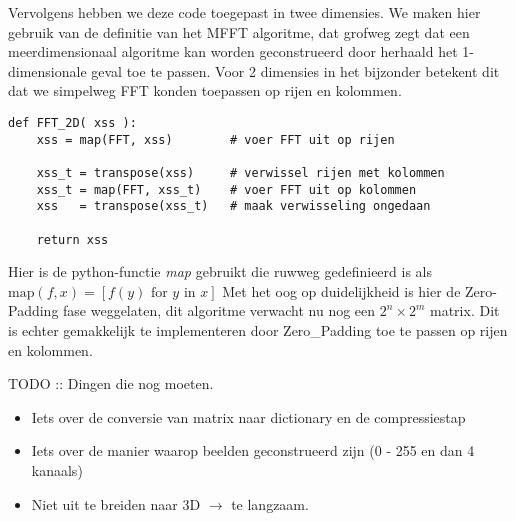 Vervolgens hebben we deze code toegepast in twee dimensies. We maken hier gebruik van de definitie van het
MFFT algoritme, dat grofweg zegt dat een meerdimensionaal algoritme kan worden geconstrueerd door herhaald 
het 1-dimensionale geval toe te passen. Voor 2 dimensies in het bijzonder betekent dit dat we simpelweg 
FFT konden toepassen op rijen en kolommen.

\begin{lstlisting}[caption=2-Dimensionaal FFT algoritme]
def FFT_2D( xss ):
    xss = map(FFT, xss)        # voer FFT uit op rijen

    xss_t = transpose(xss)     # verwissel rijen met kolommen
    xss_t = map(FFT, xss_t)    # voer FFT uit op kolommen
    xss   = transpose(xss_t)   # maak verwisseling ongedaan 

    return xss
\end{lstlisting}
Hier is de python-functie \emph{map} gebruikt die ruwweg gedefinieerd is als 
$\text{map}(f,x) = [f(y) \text{ for } y \text{ in } x]$
Met het oog op duidelijkheid is hier de Zero-Padding fase weggelaten, 
dit algoritme verwacht nu nog een $2^n \times 2^m$ matrix.
Dit is echter gemakkelijk te implementeren door Zero\_Padding toe te passen op rijen en kolommen.


TODO :: 
Dingen die nog moeten.
\begin{itemize}
\item Iets over de conversie van matrix naar dictionary en de compressiestap 
\item Iets over de manier waarop beelden geconstrueerd zijn (0 - 255 en dan 4 kanaals)
\item Niet uit te breiden naar 3D $\to$ te langzaam.
\end{itemize}